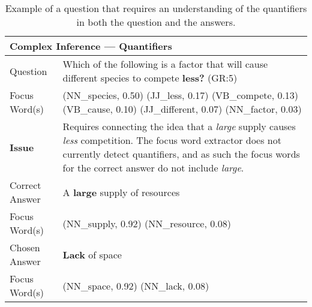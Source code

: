 \begin{table}[]
\begin{footnotesize}
\begin{tabularx}{\textwidth}{p{2.5cm}p{10cm}}
\hline
\multicolumn{2}{l}{Complex Inference --- Quantifiers} \\
\hline
Question 		& Which of the following is a factor that will cause different species to compete {\bf less?} (GR:5)  \\
Focus Word(s) 	& (NN\_species, 0.50) (JJ\_less, 0.17) (VB\_compete, 0.13) (VB\_cause, 0.10) (JJ\_different, 0.07) (NN\_factor, 0.03)\\
\textbf{Issue}			&  Requires connecting the idea that a \emph{large} supply causes \emph{less} competition.  The focus word extractor does not currently detect quantifiers, and as such the focus words for the correct answer do not include \emph{large}. \\
\hline
Correct Answer 	&  A {\bf large} supply of resources\\
Focus Word(s) 	&  (NN\_supply, 0.92) (NN\_resource, 0.08)\\
\hline
Chosen Answer & {\bf Lack} of space \\
Focus Word(s) &  (NN\_space, 0.92) (NN\_lack, 0.08)\\
\hline
\end{tabularx}
\end{footnotesize}
\caption{{  Example of a question that requires an understanding of the quantifiers in both the question and the answers. }} 
\label{ex:quantifiers}
\end{table}

 
